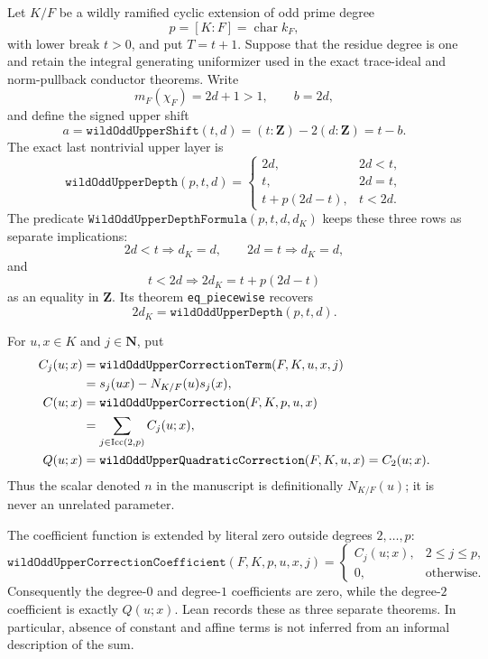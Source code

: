\begin{lemma}
\label{mod:cases-wildodd-highervanishing}
Let $K/F$ be a wildly ramified cyclic extension of odd prime degree
\[
 p=[K:F]=\operatorname{char}k_F,
\]
with lower break $t>0$, and put $T=t+1$.  Suppose that the residue degree
is one and retain the integral generating uniformizer used in the exact
trace-ideal and norm-pullback conductor theorems.  Write
\[
 m_F(\chi_F)=2d+1>1,\qquad b=2d,
\]
and define the signed upper shift
\begin{equation}\label{eq:lean-wildodd-upper-shift}
 a=\texttt{wildOddUpperShift}(t,d)=(t:\mathbf Z)-2(d:\mathbf Z)=t-b.
\end{equation}
The exact last nontrivial upper layer is
\begin{equation}\label{eq:lean-wildodd-upper-depth}
 \texttt{wildOddUpperDepth}(p,t,d)=
 \begin{cases}
  2d,&2d<t,\\
  t,&2d=t,\\
  t+p(2d-t),&t<2d.
 \end{cases}
\end{equation}
The predicate $\texttt{WildOddUpperDepthFormula}(p,t,d,d_K)$ keeps these
three rows as separate implications:
\[
 2d<t\Longrightarrow d_K=d,\qquad
 2d=t\Longrightarrow d_K=d,
\]
and
\[
 t<2d\Longrightarrow
 2d_K=t+p(2d-t)
\]
as an equality in $\mathbf Z$.  Its theorem \texttt{eq\_piecewise}
recovers
\[
 2d_K=\texttt{wildOddUpperDepth}(p,t,d).
\]

For $u,x\in K$ and $j\in\mathbf N$, put
\begin{align}
 C_j(u;x)
  &=\texttt{wildOddUpperCorrectionTerm}(F,K,u,x,j)\notag\\
  &=s_j(ux)-N_{K/F}(u)s_j(x),
 \label{eq:lean-wildodd-correction-term}\\
 C(u;x)
  &=\texttt{wildOddUpperCorrection}(F,K,p,u,x)\notag\\
  &=\sum_{j\in\operatorname{Icc}(2,p)}C_j(u;x),
 \label{eq:lean-wildodd-correction}\\
 Q(u;x)
  &=\texttt{wildOddUpperQuadraticCorrection}(F,K,u,x)=C_2(u;x).
 \label{eq:lean-wildodd-quadratic}
\end{align}
Thus the scalar denoted $n$ in the manuscript is definitionally
$N_{K/F}(u)$; it is never an unrelated parameter.

The coefficient function is extended by literal zero outside degrees
$2,\ldots,p$:
\begin{equation}\label{eq:lean-wildodd-coefficient}
 \texttt{wildOddUpperCorrectionCoefficient}(F,K,p,u,x,j)=
 \begin{cases}
  C_j(u;x),&2\le j\le p,\\
  0,&\text{otherwise}.
 \end{cases}
\end{equation}
Consequently the degree-$0$ and degree-$1$ coefficients are zero, while
the degree-$2$ coefficient is exactly $Q(u;x)$.  Lean records these as
three separate theorems.  In particular, absence of constant and affine
terms is not inferred from an informal description of the sum.


\end{lemma}
